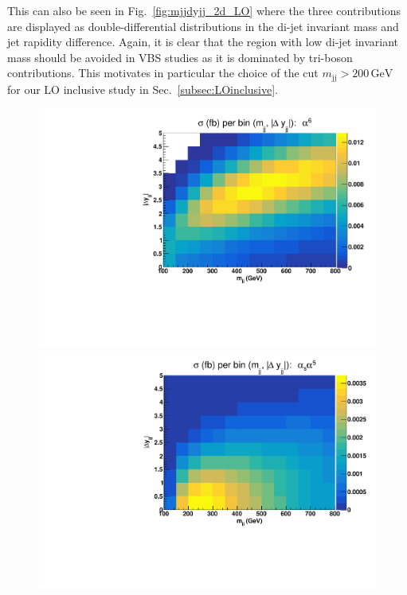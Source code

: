 \documentclass[twocolumn,epjc3]{svjour3} %
\newcommand{\Pj}{\ensuremath{\text{j}}\xspace}
\newcommand{\GeV}{\ensuremath{\,\text{GeV}}\xspace}
\begin{document}
    This can also be seen in Fig.~\ref{fig:mjjdyjj_2d_LO} where the three contributions are displayed as double-differential distributions in the di-jet invariant mass and jet rapidity difference.
    Again, it is clear that the region with low di-jet invariant mass should be avoided in VBS studies as it is dominated by tri-boson contributions.
    This motivates in particular the choice of the cut $m_{\Pj\Pj} > 200\GeV$ for our LO inclusive study in Sec.~\ref{subsec:LOinclusive}.

    \begin{figure}
    \centering
    \includegraphics[scale=0.395]{figures/scanfigures/scan_ew6.pdf}
    \includegraphics[scale=0.395]{figures/scanfigures/scan_ew5qcd1.pdf}

\end{figure}
\end{document}
